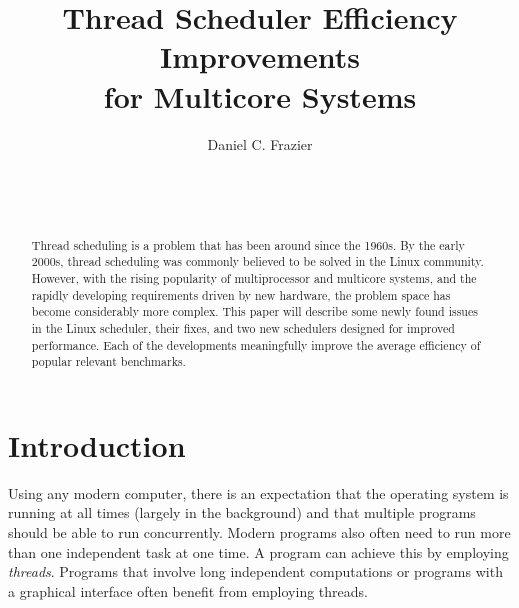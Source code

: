 \documentclass{sig-alternate}
\begin{document}

\title{Thread Scheduler Efficiency Improvements \\ for Multicore Systems}


\author{
\alignauthor
Daniel C. Frazier\\
	\\
	\\
	\\
}
\maketitle

\begin{abstract}

Thread scheduling is a problem that has been around since the 1960s. By the early 2000s, thread scheduling was commonly believed to be solved in the Linux community. However, with the rising popularity of multiprocessor and multicore systems, and the rapidly developing requirements driven by new hardware, the problem space has become considerably more complex. This paper will describe some newly found issues in the Linux scheduler, their fixes, and two new schedulers designed for improved performance. Each of the developments meaningfully improve the average efficiency of popular relevant benchmarks.

\end{abstract}


\section{Introduction}
\label{sec:intro}

Using any modern computer, there is an expectation that the operating system is running at all times (largely in the background) and that multiple programs should be able to run concurrently. Modern programs also often need to run more than one independent task at one time. A program can achieve this by employing \emph{threads}. Programs that involve long independent computations or programs with a graphical interface often benefit from employing threads.
\end{document}
